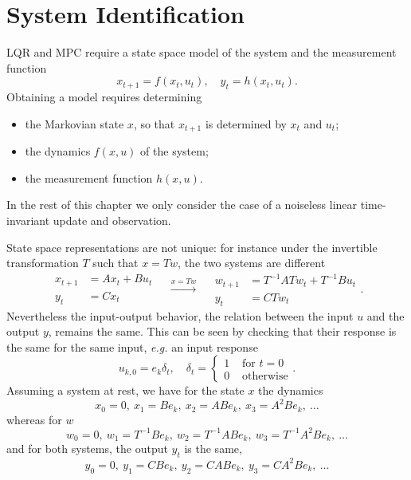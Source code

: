 \chapter{System Identification}
\label{sec:system-identification}

LQR and MPC require a state space model of the system and the measurement function
\begin{equation*}
  x_{t+1} = f(x_t,u_t),\quad y_t = h(x_t,u_t).
\end{equation*}
Obtaining a model requires determining
\begin{itemize}
\item the Markovian state $x$, so that $x_{t+1}$ is determined by $x_t$ and $u_t$;
\item the dynamics $f(x,u)$ of the system;
\item the measurement function $h(x,u)$.
\end{itemize}
In the rest of this chapter we only consider the case of a noiseless linear time-invariant update and observation.

State space representations are not unique: for instance under the invertible transformation $T$ such that $x=Tw$, the two systems are different
\begin{equation*}
  \begin{aligned}
    x_{t+1} &= Ax_t + Bu_t \\
    y_t &= Cx_t
  \end{aligned}\quad \stackrel{x=Tw}{\longrightarrow}\quad
  \begin{aligned}
    w_{t+1} &= T^{-1}ATw_t + T^{-1}Bu_t \\
    y_t &= CTw_t
  \end{aligned}.
\end{equation*}
Nevertheless the input-output behavior, the relation between the input $u$ and the output $y$, remains the same. This can be seen by checking that their response is the same for the same input, \textit{e.g.} an input response
\begin{equation*}
  u_{k,0} = e_k\delta_t,\quad \delta_t =
  \begin{cases}
    1 & \text{ for } t=0 \\
    0 & \text{ otherwise}
  \end{cases}.
\end{equation*}
Assuming a system at rest, we have for the state $x$ the dynamics
\begin{equation*}
  x_0=0,\ x_1=Be_k,\ x_2=ABe_k,\ x_3=A^2Be_k,\ \ldots
\end{equation*}
whereas for $w$
\begin{equation*}
  w_0=0,\ w_1=T^{-1}Be_k,\ w_2=T^{-1}ABe_k,\ w_3=T^{-1}A^2Be_k,\ \ldots
\end{equation*}
and for both systems, the output $y_t$ is the same,
\begin{equation*}
  y_0=0,\ y_1=CBe_k,\ y_2=CABe_k,\ y_3=CA^2Be_k,\ \ldots
\end{equation*}

